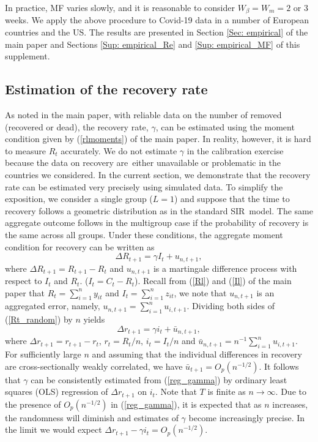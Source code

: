 \documentclass[12pt]{article}
\begin{document}
In practice, MF varies slowly, and it is reasonable to consider $W_{\beta
}=W_{m}=2$ or $3$ weeks. We apply the above procedure to Covid-19 data in a
number of European countries and the US. The results are presented in Section
\ref{Sec: empirical} of the main paper and Sections \ref{Sup: empirical_Re}
and \ref{Sup: empirical_MF} of this supplement.

\subsection{Estimation of the recovery rate \label{Sup: recovery}}

As noted in the main paper, with reliable data on the number of removed
(recovered or dead), the recovery rate, $\gamma$, can be estimated using the
moment condition given by (\ref{rlmoments}) of the main paper. In reality,
however, it is hard to measure $R_{t}$ accurately. We do not estimate $\gamma$
in the calibration exercise because the data on recovery are\ either
unavailable or problematic in the countries we considered. In the current
section, we demonstrate that the recovery rate can be estimated very precisely
using simulated data. To simplify the exposition, we consider a single group
($L=1$) and suppose that the time to recovery follows a geometric distribution
as in the standard SIR\ model. The same aggregate outcome follows in the
multigroup case if the probability of recovery is the same across all groups.
Under these conditions, the aggregate moment condition for recovery can be
written as%
\begin{equation}
\Delta R_{t+1}=\gamma I_{t}+u_{n,t+1}, \label{Rt_random}%
\end{equation}
where $\Delta R_{t+1}=R_{t+1}-R_{t}$ and $u_{n,t+1}$ is a martingale
difference process with respect to $I_{t}$ and $R_{t}$. ($I_{t}=C_{t}-R_{t}$).
Recall from (\ref{Rl}) and (\ref{Il}) of the main paper that $R_{t}=\sum
_{i=1}^{n}y_{it}$ and $I_{t}=\sum_{i=1}^{n}z_{it}$, we note that $u_{n,t+1}$
is an aggregated error, namely, $u_{n,t+1}=\sum_{i=1}^{n}u_{i,t+1}.$ Dividing
both sides of (\ref{Rt_random}) by $n$ yields
\begin{equation}
\Delta r_{t+1}=\gamma i_{t}+\bar{u}_{n,t+1}, \label{reg_gamma}%
\end{equation}
where $\Delta r_{t+1}=r_{t+1}-r_{t}$, $r_{t}=R_{t}/n$, $i_{t}=I_{t}/n$ and
$\bar{u}_{n,t+1}=n^{-1}\sum_{i=1}^{n}u_{i,t+1}$. For sufficiently large $n$
and assuming that the individual differences in recovery are cross-sectionally
weakly correlated, we have $\bar{u}_{t+1}=O_{p}(n^{-1/2})$. It follows that
$\gamma$ can be consistently estimated from (\ref{reg_gamma}) by ordinary
least squares (OLS) regression of $\Delta r_{t+1}$ on $i_{t}$. Note that $T$
is finite as $n\rightarrow\infty$. Due to the presence of $O_{p}\left(
n^{-1/2}\right)  $ in (\ref{reg_gamma}), it is expected that as $n$ increases,
the randomness will diminish and estimates of $\gamma$ become increasingly
precise. In the limit we would expect $\Delta r_{t+1}-\gamma i_{t}%
=O_{p}(n^{-1/2})$.
\end{document}
